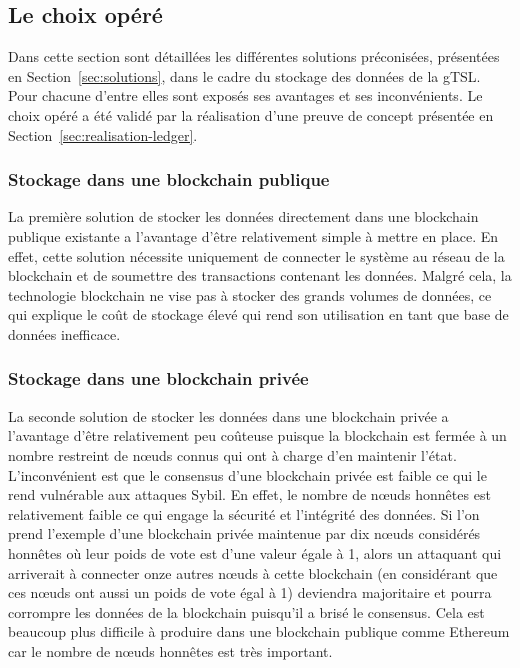 \documentclass{tnreport}
\begin{document}
\subsection{Le choix opéré}
\label{sec:choice}

Dans cette section sont détaillées les différentes solutions préconisées, présentées en Section~\ref{sec:solutions}, dans le cadre du stockage des données de la gTSL. Pour chacune d'entre elles sont exposés ses avantages et ses inconvénients.
Le choix opéré a été validé par la réalisation d'une preuve de concept présentée en Section~\ref{sec:realisation-ledger}.

\subsubsection{Stockage dans une blockchain publique}

La première solution de stocker les données directement dans une blockchain publique existante a l'avantage d'être relativement simple à mettre en place. En effet, cette solution nécessite uniquement de connecter le système au réseau de la blockchain et de soumettre des transactions contenant les données. Malgré cela, la technologie blockchain ne vise pas à stocker des grands volumes de données, ce qui explique le coût de stockage élevé qui rend son utilisation en tant que base de données inefficace.

\subsubsection{Stockage dans une blockchain privée}

La seconde solution de stocker les données dans une blockchain privée a l'avantage d'être relativement peu coûteuse puisque la blockchain est fermée à un nombre restreint de nœuds connus qui ont à charge d'en maintenir l'état. L'inconvénient est que le consensus d'une blockchain privée est faible ce qui le rend vulnérable aux attaques Sybil. En effet, le nombre de nœuds honnêtes est relativement faible ce qui engage la sécurité et l'intégrité des données. Si l'on prend l'exemple d'une blockchain privée maintenue par dix nœuds considérés honnêtes où leur poids de vote est d'une valeur égale à 1, alors un attaquant qui arriverait à connecter onze autres nœuds à cette blockchain (en considérant que ces nœuds ont aussi un poids de vote égal à 1) deviendra majoritaire et pourra corrompre les données de la blockchain puisqu'il a brisé le consensus. Cela est beaucoup plus difficile à produire dans une blockchain publique comme Ethereum car le nombre de nœuds honnêtes est très important.
\end{document}
